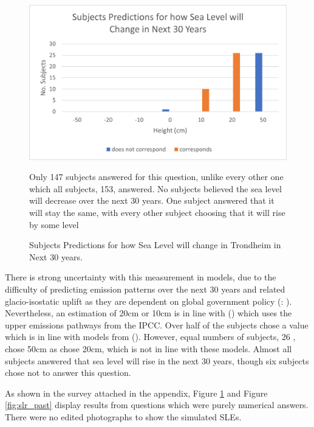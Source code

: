 \begin{figure}[H]
    \centering
    \includegraphics{fig_results/slr-future.png}
    \caption{Subjects Predictions for how Sea Level will change in Trondheim in Next 30 years.}{Only 147 subjects answered for this question, unlike every other one which all subjects, 153, answered. No subjects believed the sea level will decrease over the next 30 years. One subject answered that it will stay the same, with every other subject choosing that it will rise by some level }
    \label{fig:slr_future}
\end{figure}

There is strong uncertainty with this measurement in models, due to the difficulty of predicting emission patterns over the next 30 years and related glacio-isostatic uplift as they are dependent on global government policy (\cite{hanssen-bauer_climate_2017}: \cite{kartverket_se_2021}). Nevertheless, an estimation of 20cm or 10cm is in line with (\cite{kartverket_se_2021}) which uses the upper emissions pathways from the IPCC. Over half of the subjects chose a value which is in line with models from (\cite{kartverket_se_2021}). However, equal numbers of subjects, 26 , chose 50cm as chose 20cm,  which is not in line with these models. Almost all subjects answered that sea level will rise in the next 30 years, though six subjects chose not to answer this question.  

As shown in the survey attached in the appendix, Figure \ref{fig:slr_future} and Figure \ref{fig:slr_past} display results from questions which were purely numerical answers. There were no edited photographs to show the simulated SLEs.
\paragraph{}


